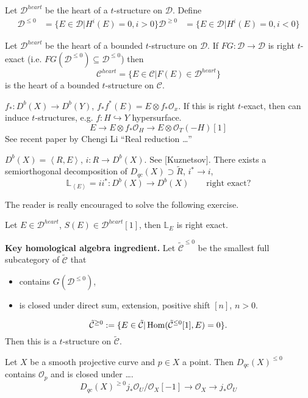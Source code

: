 \begin{definition}
\label{definition-vanishing-cohomologies-subcategories}
Let $\mathcal{D}^{heart}$ be the heart of a $t$-structure on $\mathcal{D}$.
Define
\begin{align*}
\mathcal{D}^{\leq 0}&=\{E \in \mathcal{D}|H^{i}(E)=0, i>0\}
\mathcal{D}^{\geq 0}&=\{E \in \mathcal{D}|H^{i}(E)=0, i<0\}
\end{align*}
\end{definition}

\begin{theorem}[Polischuk]
\label{theorem-Polischuk}
Let $\mathcal{D}^{heart}$ be the heart of a bounded $t$-structure on
$\mathcal{D}$. If $FG:\mathcal{D} \to \mathcal{D}$ is right $t$-exact 
(i.e. $FG(\mathcal{D}^{\leq 0})\subseteq \mathcal{D}^{\leq 0}$) 
then 
$$
\mathcal{C}^{heart}=\{E \in \mathcal{C}|F(E) \in \mathcal{D}^{heart}\}
$$
is the heart of a bounded $t$-structure on $\mathcal{C}$.
\end{theorem}

\begin{example}
\label{example-right}
$f_*:D^b(X) \to D^b(Y)$, $f_*f^*(E)=E\otimes f_*\mathcal{O}_x$. 
If this is right $t$-exact, then can induce $t$-structures, e.g. 
$f:H \hookrightarrow Y$ hypersurface.
$$
E \to E \otimes f_*\mathcal{O}_H\to E\otimes \mathcal{O}_T(-H)[1]
$$
See recent paper by Chengi Li ``Real reduction …''
\end{example}

\begin{example}
\label{example-Kuznetsov}
$D^b(X)=\left<R,E\right>$, $i:R \to D^b(X)$. See [Kuznetsov]. There exists a
semiorthogonal decomposition of $D_{qc}(X) \supset \tilde{R}$, $i^* \to i$,
$$
\mathbb{L}_{\left<E\right>}=ii^* :D^b(X) \to D^b(X)\qquad \text{right exact?}
$$
\end{example}

The reader is really encouraged to solve the following exercise.

\begin{exercise}
\label{exercise-right-exact}
Let $E \in \mathcal{D}^{heart}$, $S(E) \in \mathcal{D}^{heart}[1]$, then
$\mathbb{L}_E$ is right exact.
\end{exercise}

\noindent
{\bf Key homological algebra ingredient.} Let $\tilde{\mathcal{C}}^{\leq 0}$ 
be the smallest full subcategory of $\tilde{\mathcal{C}}$ that
\begin{itemize}
\item contains $G(\mathcal{D}^{\leq 0})$,
\item is closed under direct sum, extension, positive shift $[n]$, $n>0$.
\end{itemize}
$$
\tilde{\mathcal{C}}^{\geq 0}:=\{E \in \tilde{\mathcal{C}}|
\mathop{\mathrm{Hom}}\nolimits(\tilde{\mathcal{C}}^{\leq 0}[1],E)=0\}.
$$
Then this is a $t$-structure on $\tilde{\mathcal{C}}$.

\begin{example}
\label{example-curve}
Let $X$ be a smooth projective curve and $p \in X$ a point. Then
$D_{qc}(X)^{\leq 0}$ contains $\mathcal{O}_p$ and is closed under ….
$$
D_{qc}(X)^{\geq 0}j_* \mathcal{O}_U/\mathcal{O}_X[-1] \to 
\mathcal{O}_X \to j_*\mathcal{O}_U
$$
\end{example}


